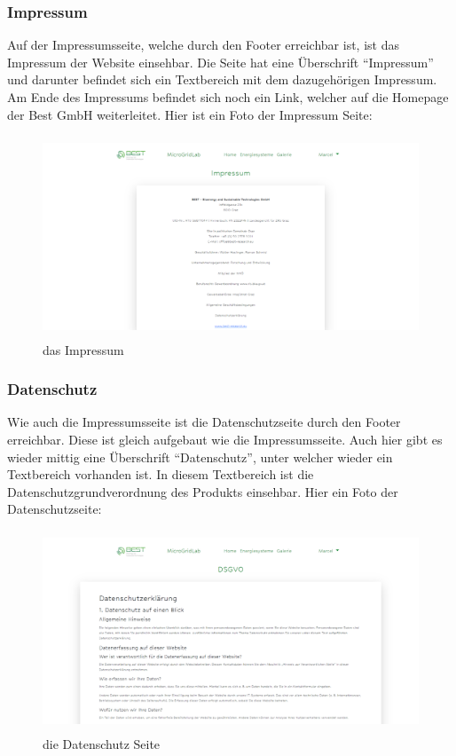 \subsubsection{Impressum}
Auf der Impressumsseite, welche durch den Footer erreichbar ist, ist das Impressum der Website einsehbar. Die Seite hat eine Überschrift  “Impressum” und darunter befindet sich ein Textbereich  mit dem dazugehörigen Impressum. Am Ende des Impressums befindet sich noch ein Link, welcher auf die Homepage der Best GmbH weiterleitet. Hier ist ein Foto der Impressum Seite:

\begin{figure}[h]
	\centering
	\includegraphics[height=6cm,width=14cm]{images/ImpressumSeite}
	\caption{das Impressum}
	\label{fig:Impressum}
\end{figure}
\newpage
\subsubsection{Datenschutz}
Wie auch die Impressumsseite ist die Datenschutzseite durch den Footer erreichbar. Diese ist gleich aufgebaut wie die Impressumsseite. Auch hier gibt es wieder mittig eine Überschrift “Datenschutz”, unter welcher wieder ein Textbereich vorhanden ist. In diesem Textbereich  ist die Datenschutzgrundverordnung des Produkts einsehbar.  Hier ein Foto der Datenschutzseite:
\begin{figure}[h]
	\centering
	\includegraphics[height=6cm,width=14cm]{images/DSGVOSeite}
	\caption{die Datenschutz Seite}
	\label{fig:DSGVO}
\end{figure}
